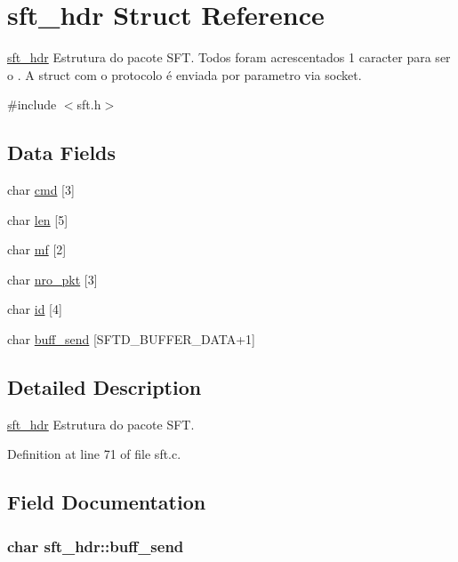 \hypertarget{structsft__hdr}{
\section{sft\_\-hdr Struct Reference}
\label{structsft__hdr}
}


\hyperlink{structsft__hdr}{sft\_\-hdr} Estrutura do pacote SFT. Todos foram acrescentados 1 caracter para ser o . A struct com o protocolo é enviada por parametro via socket.  




{\ttfamily \#include $<$sft.h$>$}

\subsection*{Data Fields}
\begin{DoxyCompactItemize}
\item 
char \hyperlink{structsft__hdr_ab60765ff033657730f7b034d4b8a9f88}{cmd} \mbox{[}3\mbox{]}
\item 
char \hyperlink{structsft__hdr_a31b3e7b8cb3009491ba6358f4ff005c6}{len} \mbox{[}5\mbox{]}
\item 
char \hyperlink{structsft__hdr_a8bbe50f01aadaeba7c765e3cc8191195}{mf} \mbox{[}2\mbox{]}
\item 
char \hyperlink{structsft__hdr_a5707c36204763f68f1c11f3096819e24}{nro\_\-pkt} \mbox{[}3\mbox{]}
\item 
char \hyperlink{structsft__hdr_a63dce22de86fc545eb00e4f6d3c2ba3d}{id} \mbox{[}4\mbox{]}
\item 
char \hyperlink{structsft__hdr_a0bd699439a99751b63da1e67764104c0}{buff\_\-send} \mbox{[}SFTD\_\-BUFFER\_\-DATA+1\mbox{]}
\end{DoxyCompactItemize}


\subsection{Detailed Description}
\hyperlink{structsft__hdr}{sft\_\-hdr} Estrutura do pacote SFT. 

Definition at line 71 of file sft.c.



\subsection{Field Documentation}
\hypertarget{structsft__hdr_a0bd699439a99751b63da1e67764104c0}{
\subsubsection[{buff\_\-send}]{\setlength{\rightskip}{0pt plus 5cm}char {\bf sft\_\-hdr::buff\_\-send}}}
\label{structsft__hdr_a0bd699439a99751b63da1e67764104c0}


